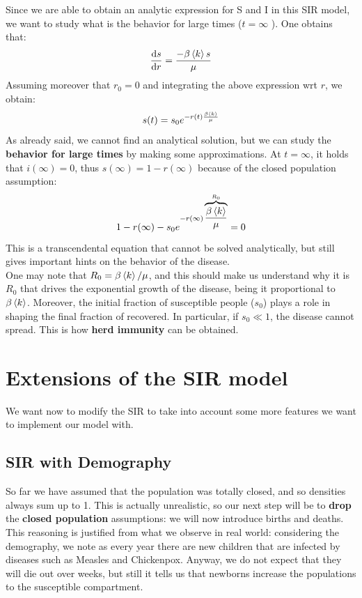 \documentclass[../main/main.tex]{subfiles}
\begin{document}
Since we are able to obtain an analytic expression for S and I in this SIR model, we want to study what is the behavior for large times ($ t = \infty$ ). One obtains that:
\begin{equation*}
  \dv{s}{r} = \frac{- \beta  \expval{k}  s}{\mu }
\end{equation*}
Assuming moreover that \( r_0 = 0  \) and integrating the above expression wrt \( r \), we obtain:
\begin{equation*}
  s(t) = s_0 e^{-r(t) \frac{\beta \expval{k} }{\mu }}
\end{equation*}
As already said, we cannot find an analytical solution, but we can study the \textbf{behavior for large times} by making some approximations. At \( t=\infty  \), it holds that \( i (\infty ) = 0 \), thus \( s(\infty ) = 1 - r(\infty ) \) because of the closed population assumption:
\begin{equation*}
  1 - r(\infty ) - s_0 e^{-r(\infty ) \overbrace{\frac{\beta \expval{k} }{\mu }}^{R_0}} = 0
\end{equation*}
This is a transcendental equation that cannot be solved analytically, but still gives important hints on the behavior of the disease.\\
One may note that \( R_0 = \beta \expval{k} / \mu   \), and this should make us understand why it is \( R_0 \) that drives the exponential growth of the disease, being it proportional to $\beta \expval{k}$. Moreover, the initial fraction of susceptible people ($s_0$) plays a role in shaping the final fraction of recovered. In particular, if \( s_0 \ll 1 \), the disease cannot spread. This is how \textbf{herd immunity} can be obtained.


\section{Extensions of the SIR model}
We want now to modify the SIR to take into account some more features we want to implement our model with.

\subsection{SIR with Demography}
So far we have assumed that the population was totally closed, and so densities always sum up to 1. This is actually unrealistic, so our next step will be to \textbf{drop} the \textbf{closed population} assumptions: we will now introduce births and deaths. This reasoning is justified from what we observe in real world: considering the demography, we note as every year there are new children that are infected by diseases such as Measles and Chickenpox. Anyway, we do not expect that they will die out over weeks, but still it tells us that newborns increase the populations to the susceptible compartment.
\end{document}
